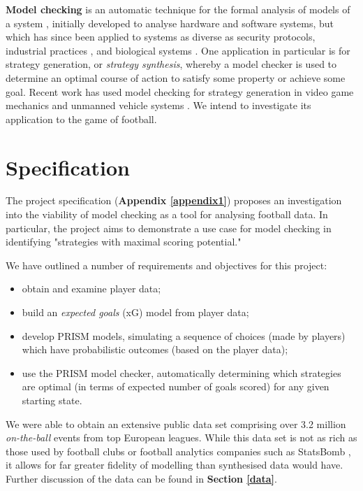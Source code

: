 \documentclass{l4proj}
\begin{document}
\textbf{Model checking} is an automatic technique for the formal analysis of models of a system \cite{pomc1}, initially developed to analyse hardware and software systems, but which has since been applied to systems as diverse as security protocols, industrial practices \cite{hmbc3}, and biological systems \cite{biomc1}. One application in particular is for strategy generation, or \textit{strategy synthesis}, whereby a model checker is used to determine an optimal course of action to satisfy some property or achieve some goal. Recent work has used model checking for strategy generation in video game mechanics \cite{kav1} and unmanned vehicle systems \cite{fac2}. We intend to investigate its application to the game of football.

\section{Specification}

The project specification (\textbf{Appendix \ref{appendix1}}) proposes an investigation into the viability of model checking as a tool for analysing football data. In particular, the project aims to demonstrate a use case for model checking in identifying "strategies with maximal scoring potential."

We have outlined a number of requirements and objectives for this project:

\begin{itemize}
    \item
    obtain and examine player data;
    \item
    build an \textit{expected goals} (xG) model from player data;
    \item
    develop PRISM models, simulating a sequence of choices (made by players) which have probabilistic outcomes (based on the player data);
    \item
    use the PRISM model checker, automatically determining which strategies are optimal (in terms of expected number of goals scored) for any given starting state. 
\end{itemize}


We were able to obtain an extensive public data set comprising over 3.2 million \textit{on-the-ball} events from top European leagues. While this data set is not as rich as those used by football clubs or football analytics companies such as StatsBomb \cite{sbomb1}, it allows for far greater fidelity of modelling than synthesised data would have. Further discussion of the data can be found in \textbf{Section \ref{data}}.
\end{document}
